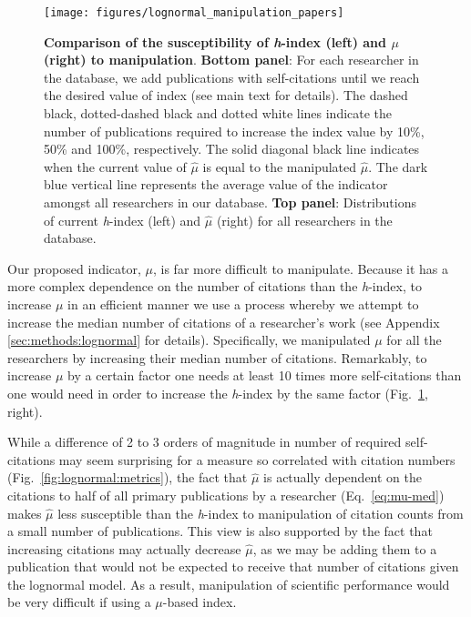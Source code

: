 \begin{figure}[t]
\texttt{[image: figures/lognormal\_manipulation\_papers]}
\caption[Comparison of the susceptibility of \emph{h}-index and $\mu$ to manipulation.]{\textbf{Comparison of the susceptibility of \emph{h}-index (left) and $\mu$ (right) to manipulation}. \textbf{Bottom panel}: For each researcher in the database, we add publications with self-citations until we reach the desired value of index (see main text for details). The dashed black, dotted-dashed black and dotted white lines indicate the number of publications required to increase the index value by 10\%, 50\% and 100\%, respectively. The solid diagonal black line indicates when the current value of $\hat{\mu}$ is equal to the manipulated $\hat{\mu}$. The dark blue vertical line represents the average value of the indicator amongst all researchers in our database. \textbf{Top panel}: Distributions of current \emph{h}-index (left) and $\hat{\mu}$ (right) for all researchers in the database.}
\label{fig:lognormal:manipulation_papers}
\end{figure}

Our proposed indicator, $\mu$, is far more difficult to manipulate. Because it has a more complex dependence on the number of citations than the \emph{h}-index, to increase $\mu$ in an efficient manner we use a process whereby we attempt to increase the median number of citations of a researcher's work (see Appendix \ref{sec:methods:lognormal} for details). Specifically, we manipulated $\mu$ for all the researchers by increasing their median number of citations. Remarkably, to increase $\mu$ by a certain factor one needs at least 10 times more self-citations than one would need in order to increase the \emph{h}-index by the same factor (Fig.~\ref{fig:lognormal:manipulation_papers}, right).

While a difference of 2 to 3 orders of magnitude in number of required self-citations may seem surprising for a measure so correlated with citation numbers (Fig.~\ref{fig:lognormal:metrics}), the fact that $\hat{\mu}$ is actually dependent on the citations to half of all primary publications by a researcher (Eq.~\eqref{eq:mu-med}) makes $\hat{\mu}$ less susceptible than the \emph{h}-index to manipulation of citation counts from a small number of publications. This view is also supported by the fact that increasing citations may actually decrease $\hat{\mu}$, as we may be adding them to a publication that would not be expected to receive that number of citations given the lognormal model. As a result, manipulation of scientific performance would be very difficult if using a $\mu$-based index.


